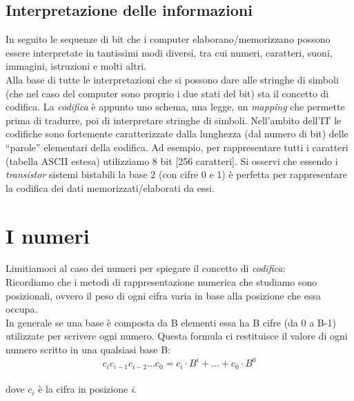 \documentclass[class=book, crop=false]{standalone}
\begin{document}
\subsection{Interpretazione delle informazioni} In seguito le sequenze di bit che i computer elaborano/memorizzano possono essere interpretate in tantissimi modi diversi, tra cui numeri, caratteri, suoni, immagini, istruzioni e molti altri.\\
Alla base di tutte le interpretazioni che si possono dare alle stringhe di simboli (che nel caso del computer sono proprio i due stati del bit) sta il concetto di codifica. La \emph{codifica} è appunto uno schema, una legge, un \emph{mapping} che permette prima di tradurre, poi di interpretare stringhe di simboli.
Nell’ambito dell’IT le codifiche sono fortemente caratterizzate dalla lunghezza (dal numero di bit) delle “parole” elementari della codifica. Ad esempio, per rappresentare tutti i caratteri (tabella ASCII estesa) utilizziamo  8 bit [256 caratteri].
Si osservi che essendo i \emph{transistor} sistemi bistabili la base 2 (con cifre 0 e 1) è perfetta per rappresentare la codifica dei dati memorizzati/elaborati da essi.
\section{I numeri}
Limitiamoci al caso dei numeri per spiegare il concetto di \emph{codifica}:\\
Ricordiamo che i  metodi di rappresentazione numerica che studiamo sono posizionali, ovvero il peso di ogni cifra varia in base alla posizione che essa  occupa.\\
In generale se una base è composta da B elementi essa ha B cifre (da 0 a B-1) utilizzate per scrivere ogni numero.
Questa formula ci restituisce il valore di ogni numero scritto in una qualsiasi base B:\\
\[c_{i} c_{i-1} c_{i-2}... c_{0}=c_{i}\cdot B^{i}+...+c_{0}\cdot B^{0}\]\\
dove $c_{i}$ è la cifra in posizione \emph{i}.
\end{document}
